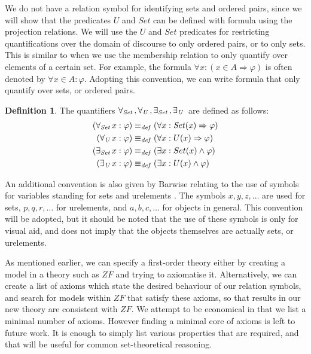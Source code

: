 \documentclass[11pt]{report}
\newcommand{\all}[1]{\forall_{\mathit{#1}}\hspace{0.5mm}}
\newcommand{\ex}[1]{\exists_{\mathit{#1}}\hspace{0.5mm}}
\newcommand{\eqdef}{\equiv_\mathit{def}}
\theoremstyle{definition}
\theoremstyle{theorem}
\theoremstyle{lemma}
\newtheorem{definition}{Definition}[section]
\begin{document}
We do not have a relation symbol for identifying sets and ordered pairs, since we will show that the predicates $U$ and $\mathit{Set}$ can be defined with formula using the projection relations.
We will use the $\mathit{U}$ and $\mathit{Set}$ predicates for restricting quantifications over the domain of discourse to only ordered pairs, or to only sets.
This is similar to when we use the membership relation to only quantify over elements of a certain set.
For example, the formula $\forall x: (x\in A \Rightarrow \varphi)$ is often denoted by $\forall x\in A: \varphi$.
Adopting this convention, we can write formula that only quantify over sets, or ordered pairs.
\begin{definition}
The quantifiers $\all{Set}, \all{U}, \ex{Set}, \ex{U}$ are defined as follows:
\begin{align*}
  (\all{Set} x: \varphi) &\eqdef (\forall x: \mathit{Set(x)} \Rightarrow \varphi)\\
  (\all{U} x: \varphi) &\eqdef (\forall x: U(x) \Rightarrow \varphi)\\
  (\ex{Set} x: \varphi) &\eqdef (\exists x: Set(x) \wedge \varphi)\\
  (\ex{U} x: \varphi) &\eqdef (\exists x: U(x) \wedge \varphi)
\end{align*}
\end{definition}
\noindent
An additional convention is also given by Barwise relating to the use of symbols for variables standing for sets and urelements \cite{barwise}.
The symbols $x,y,z,\ldots$ are used for sets, $p,q,r,\ldots$ for urelements, and $a,b,c,\ldots$ for objects in general.
This convention will be adopted, but it should be noted that the use of these symbols is only for visual aid, and does not imply that the objects themselves are actually sets, or urelements.

As mentioned earlier, we can specify a first-order theory either by creating a model in a theory such as $\mathit{ZF}$ and trying to axiomatise it.
Alternatively, we can create a list of axioms which state the desired behaviour of our relation symbols, and search for models within $\mathit{ZF}$ that satisfy these axioms, so that results in our new theory are consistent with $\mathit{ZF}$.
We attempt to be economical in that we list a minimal number of axioms. 
However finding a minimal core of axioms is left to future work.
It is enough to simply list various properties that are required, and that will be useful for common set-theoretical reasoning. 
\end{document}
